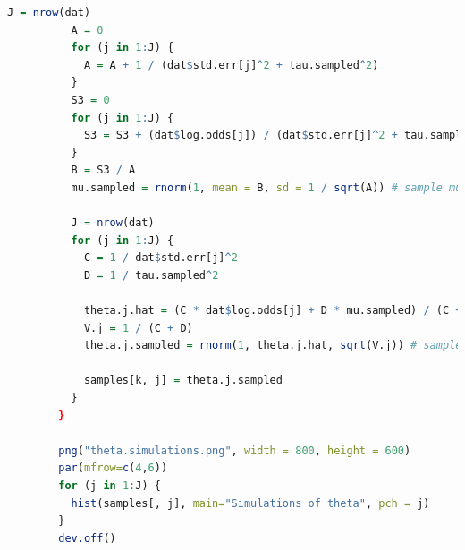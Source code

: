 \documentclass{article}
\begin{document}
{\begin{lstlisting}[language=R]
          J = nrow(dat)
          A = 0
          for (j in 1:J) {
            A = A + 1 / (dat$std.err[j]^2 + tau.sampled^2)
          }
          S3 = 0
          for (j in 1:J) {
            S3 = S3 + (dat$log.odds[j]) / (dat$std.err[j]^2 + tau.sampled^2)
          }
          B = S3 / A
          mu.sampled = rnorm(1, mean = B, sd = 1 / sqrt(A)) # sample mu
          
          J = nrow(dat)
          for (j in 1:J) {
            C = 1 / dat$std.err[j]^2
            D = 1 / tau.sampled^2
            
            theta.j.hat = (C * dat$log.odds[j] + D * mu.sampled) / (C + D)
            V.j = 1 / (C + D)
            theta.j.sampled = rnorm(1, theta.j.hat, sqrt(V.j)) # sample theta_j
            
            samples[k, j] = theta.j.sampled
          }
        }
        
        png("theta.simulations.png", width = 800, height = 600)
        par(mfrow=c(4,6))
        for (j in 1:J) {
          hist(samples[, j], main="Simulations of theta", pch = j)
        }
        dev.off()

    \end{lstlisting}
}

\clearpage
\end{document}
